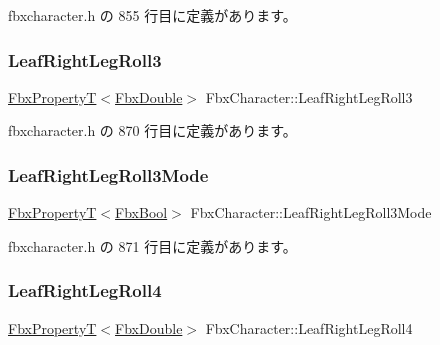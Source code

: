  fbxcharacter.\+h の 855 行目に定義があります。

\mbox{\label{class_fbx_character_ab61f326e59a7ac3e648896177b7396c3}} 
\subsubsection{\texorpdfstring{Leaf\+Right\+Leg\+Roll3}{LeafRightLegRoll3}}
{\footnotesize\ttfamily \hyperlink{class_fbx_property_t}{Fbx\+PropertyT}$<$\hyperlink{fbxtypes_8h_a171e72a1c46fc15c1a6c9c31948c1c5b}{Fbx\+Double}$>$ Fbx\+Character\+::\+Leaf\+Right\+Leg\+Roll3}



 fbxcharacter.\+h の 870 行目に定義があります。

\mbox{\label{class_fbx_character_a7d36ec898720956bfdae4945ebe08a34}} 
\subsubsection{\texorpdfstring{Leaf\+Right\+Leg\+Roll3\+Mode}{LeafRightLegRoll3Mode}}
{\footnotesize\ttfamily \hyperlink{class_fbx_property_t}{Fbx\+PropertyT}$<$\hyperlink{fbxtypes_8h_a92e0562b2fe33e76a242f498b362262e}{Fbx\+Bool}$>$ Fbx\+Character\+::\+Leaf\+Right\+Leg\+Roll3\+Mode}



 fbxcharacter.\+h の 871 行目に定義があります。

\mbox{\label{class_fbx_character_a07cad7de4af769b89577dc772647fd4d}} 
\subsubsection{\texorpdfstring{Leaf\+Right\+Leg\+Roll4}{LeafRightLegRoll4}}
{\footnotesize\ttfamily \hyperlink{class_fbx_property_t}{Fbx\+PropertyT}$<$\hyperlink{fbxtypes_8h_a171e72a1c46fc15c1a6c9c31948c1c5b}{Fbx\+Double}$>$ Fbx\+Character\+::\+Leaf\+Right\+Leg\+Roll4}



